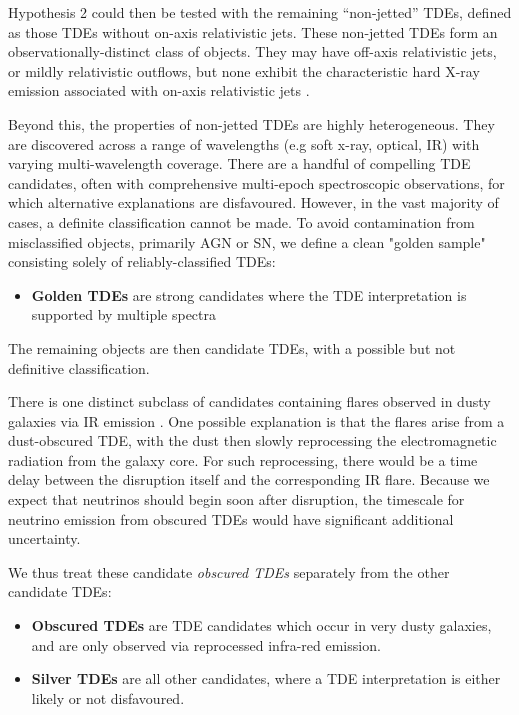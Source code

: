 Hypothesis 2 could then be tested with the remaining ``non-jetted'' TDEs, defined as those TDEs without on-axis relativistic jets. These non-jetted TDEs form an observationally-distinct class of objects. They may have off-axis relativistic jets, or mildly relativistic outflows, but none exhibit the characteristic hard X-ray emission associated with on-axis relativistic jets .

Beyond this, the properties of non-jetted TDEs are highly heterogeneous. They are discovered across a range of wavelengths (e.g soft x-ray, optical, IR) with varying multi-wavelength coverage. There are a handful of compelling TDE candidates, often with comprehensive multi-epoch spectroscopic observations, for which alternative explanations are disfavoured. However, in the vast majority of cases, a definite classification cannot be made. To avoid contamination from misclassified objects, primarily AGN or SN, we define a clean "golden sample" consisting solely of reliably-classified TDEs:

\begin{itemize}
	\item \textbf{Golden TDEs} are strong candidates where the TDE interpretation is supported by multiple spectra
\end{itemize}

The remaining objects are then candidate TDEs, with a possible but not definitive classification. 

There is one distinct subclass of candidates containing flares observed in dusty galaxies via IR emission . One possible explanation is that the flares arise from a dust-obscured TDE, with the dust then slowly reprocessing the electromagnetic radiation from the galaxy core.  For such reprocessing, there would be a time delay between the disruption itself and the corresponding IR flare. Because we expect that neutrinos should begin soon after disruption, the timescale for neutrino emission from obscured TDEs would have significant additional uncertainty. 

We thus treat these candidate \emph{obscured TDEs} separately from the other candidate TDEs:

\begin{itemize}
		\item \textbf{Obscured TDEs} are TDE candidates which occur in very dusty galaxies, and are only observed via reprocessed infra-red emission. 
	\item \textbf{Silver TDEs} are all other candidates, where a TDE interpretation is either likely or not disfavoured.
\end{itemize}

